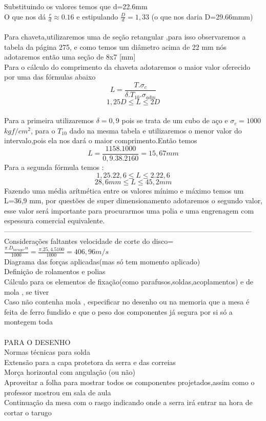 \documentclass[100pt]{article}
\begin{document}
Substituindo os valores temos que d=22.6mm \\
O que nos d\'a $\frac{r}{d}\approx0.16$ e estipulando $\frac{D}{d}=1,33$ (o que nos daria D=29.66mmm) 
\\\\ 
Para chaveta,utilizaremos uma de se\c{c}\~ao retangular ,para isso observaremos a tabela da p\'agina 275, e como temos um di\^ametro acima de 22 mm n\'os adotaremos ent\~ao uma se\c{c}\~ao de 8x7 [mm] \\
Para o c\'alculo do comprimento da chaveta adotaremos o maior valor oferecido por uma das f\'ormulas abaixo\\
$$L=\frac{T.\sigma_c}{\delta.T_{10}.\sigma_{adm}}$$
$$1,25D \le L \le 2D$$
\\
Para a primeira utilizaremos $\delta =0,9$ pois se trata de um cubo de a\c{c}o e $\sigma_c=1000$ $ kgf/cm^2$, para o $T_{10}$ dado na mesma tabela e utilizaremos o menor valor do intervalo,pois ela nos dar\'a o maior comprimento.Ent\~ao temos
$$L=\frac{1158.1000}{0,9.38.2160}=15,67mm$$
Para a segunda f\'ormula temos :
$$1,25.22,6\le L \le 2.22,6$$
$$28,6mm\le L \le 45,2 mm$$
Fazendo uma m\'edia ar\'itm\'etica entre os valores m\'inimo e m\'aximo temos um L=36,9 mm, por quest\~oes de super dimensionamento adotaremos o segundo valor, esse valor ser\'a importante para procurarmos uma polia e uma engrenagem  com espessura comercial equivalente. \\
--------------------------------------------------------------------------------------------------------\\
Considera\c{c}\~oes faltantes
velocidade de corte do disco=$\frac{\pi.D_{tarugo}.n}{1000}=\frac{\pi.25,4.5100}{1000}=406,96 m/s$\\
Diagrama das for\c{c}as aplicadas(mas s\'o tem momento aplicado)\\
Defini\c{c}\~ao de rolamentos e polias\\
C\'alculo para os elementos de fixa\c{c}\~ao(como parafusos,soldas,acoplamentos) e de mola , se tiver\\
Caso n\~ao contenha mola , especificar no desenho ou na memoria que a mesa \'e feita de ferro fundido e que o peso dos componentes j\'a segura por si s\'o a montegem toda\\
\\
PARA O DESENHO\\
Normas t\'ecnicas para solda\\
Extens\~ao para a capa protetora da serra e das correias\\
Mor\c{c}a horizontal com angula\c{c}\~ao (ou n\~ao)\\
Aproveitar a folha para mostrar todos os componentes projetados,assim como o professor mostrou em sala de aula\\
Continua\c{c}\~ao da mesa com o rasgo indicando onde a serra ir\'a entrar na hora de cortar o tarugo
\end{document}
